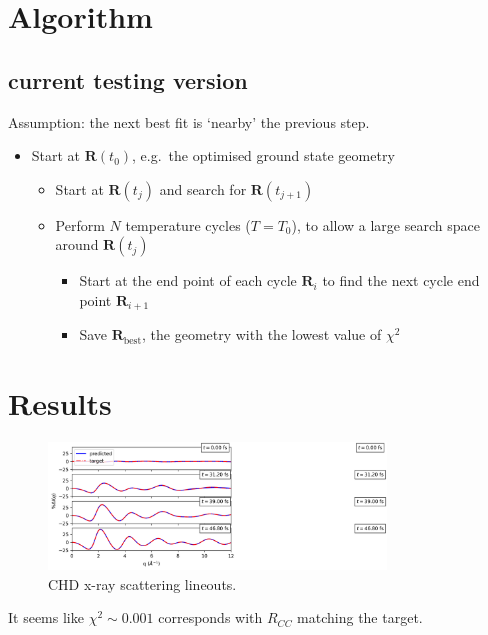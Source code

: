 \documentclass[]{article}
\newcommand{\bfR}{\textbf{R}}
\begin{document}
	\section{Algorithm}
	
	\subsection{current testing version}
	
	Assumption: the next best fit is `nearby' the previous step.
	
	\begin{itemize}
		\item Start at $\bfR(t_0)$, e.g.\ the optimised ground state geometry
		\begin{itemize}
			\item Start at $\bfR(t_j)$ and search for $\bfR(t_{j+1})$
			\item Perform $N$ temperature cycles ($T = T_0$), to allow a large search space around $\bfR(t_j)$
			\begin{itemize}
				\item Start at the end point of each cycle $\bfR_i$ to find the next cycle end point $\bfR_{i+1}$
				\item Save $\bfR_\textrm{best}$, the geometry with the lowest value of $\chi^2$
				
			\end{itemize}
		\end{itemize}
		
	\end{itemize}
	
	
	\section{Results}

	\begin{figure}[H]
	\centering
	\includegraphics[width=0.8\textwidth]{lineouts.png}
	\caption{CHD x-ray scattering lineouts.}
	\end{figure}
	
	It seems like $\chi^2 \sim 0.001$ corresponds with $R_{CC}$ matching the target.
	
\end{document}
